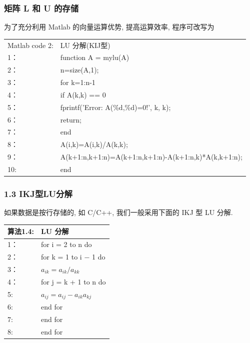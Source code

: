 \documentclass[notheorems,serif]{beamer}
\begin{document}
\begin{frame}
\frametitle{矩阵 L 和 U 的存储}
为了充分利用 Matlab 的向量运算优势, 提高运算效率, 程序可改写为
\begin{table}  
	\begin{tabular*}{16cm}{ll}  
		\hline  
		Matlab code 2: & LU 分解(KIJ型) \\    
		1：   &function A = mylu(A)\\ 
		2：   &n=size(A,1);\\
		3：   &for k=1:n-1\\
		4：   &\qquad if A(k,k) == 0\\
		5：   &\qquad fprintf('Error: A(\%d,\%d)=0!', k, k);\\
		6：   &\qquad return;\\
		7：   &\qquad end\\
		8：   &\qquad A(i,k)=A(i,k)/A(k,k);\\
		9：  &\qquad A(k+1:n,k+1:n)=A(k+1:n,k+1:n)-A(k+1:n,k)*A(k,k+1:n);\\
		10:   &end  \\
		\hline  
	\end{tabular*}  
\end{table}
\end{frame}

\begin{frame}
\frametitle{1.3 \quad IKJ型LU分解}
如果数据是按行存储的, 如 C/C++, 我们一般采用下面的 IKJ 型 LU 分解.
\begin{table}  
	\begin{tabular*}{16cm}{ll}  
		\hline  
		算法1.4: & LU 分解 \\  
		\hline  
		1：   &for i = 2 to n do\\  
		2：   &\qquad for k = 1 to i − 1 do\\
		3：   &\qquad \qquad $a_{ik} = a_{ik}/a_{kk}$\\
		4：   &\qquad \qquad for j = k + 1 to n do\\
		5:    &\qquad \qquad \qquad $a_{ij} = a_{ij} − a_{ik}a_{kj}$\\
		6:    &\qquad \qquad end for\\
		7:    &\qquad end for\\
		8:    &end for \\
		\hline  
	\end{tabular*}  
\end{table} 
\end{frame}
\end{document}

